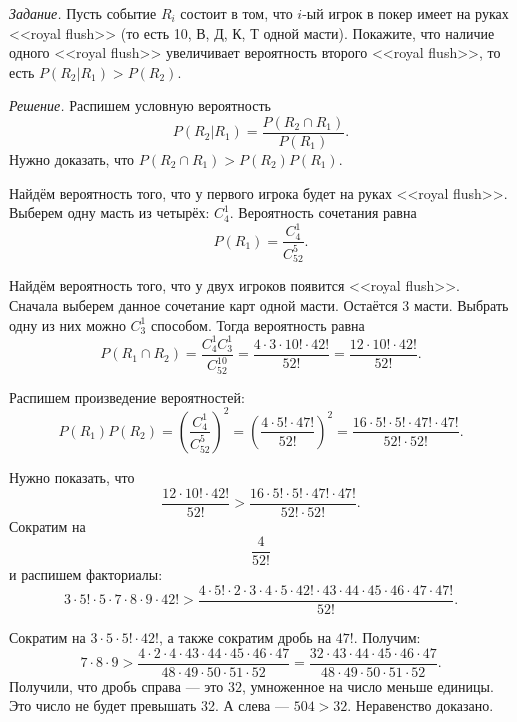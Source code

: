 \textit{Задание.} Пусть событие $R_i$ состоит в том, что $i$-ый игрок в покер имеет на руках <<royal flush>> (то есть 10, В, Д, К, Т одной масти).
Покажите, что наличие одного <<royal flush>> увеличивает вероятность второго <<royal flush>>, то есть
$P \left( \left. R_2 \right| R_1 \right) >
P \left( R_2 \right) $.

\textit{Решение.} Распишем условную вероятность
$$P \left( \left. R_2 \right| R_1 \right) =
\frac{P \left( R_2 \cap R_1 \right) }{P \left( R_1 \right) }.$$
Нужно доказать, что $P \left( R_2 \cap R_1 \right) > P \left( R_2 \right) P \left( R_1 \right) $.

Найдём вероятность того, что у первого игрока будет на руках <<royal flush>>.
Выберем одну масть из четырёх: $C_4^1$.
Вероятность сочетания равна
$$P \left( R_1 \right) =
\frac{C_4^1}{C_{52}^5}.$$

Найдём вероятность того, что у двух игроков появится <<royal flush>>.
Сначала выберем данное сочетание карт одной масти.
Остаётся 3 масти.
Выбрать одну из них можно $C_3^1$ способом.
Тогда вероятность равна
$$P \left( R_1 \cap R_2 \right) =
\frac{C_4^1C_3^1}{C_{52}^{10}} =
\frac{4 \cdot 3 \cdot 10! \cdot 42!}{52!} =
\frac{12 \cdot 10! \cdot 42!}{52!}.$$

Распишем произведение вероятностей:
$$P \left(R_1 \right) P \left( R_2 \right) =
\left( \frac{C_4^1}{C_{52}^{5}} \right)^2 =
\left( \frac{4 \cdot 5! \cdot 47!}{52!}\right)^2 =
\frac{16 \cdot 5! \cdot 5! \cdot 47! \cdot 47!}{52! \cdot 52!}.$$

Нужно показать, что
$$\frac{12 \cdot 10! \cdot 42!}{52!} >
\frac{16 \cdot 5! \cdot 5! \cdot 47! \cdot 47!}{52! \cdot 52!}.$$
Сократим на
$$ \frac{4}{52!}$$
и распишем факториалы:
$$3 \cdot 5! \cdot 5 \cdot 7 \cdot 8 \cdot 9 \cdot 42! >
\frac{4 \cdot 5! \cdot 2 \cdot 3 \cdot 4 \cdot 5 \cdot 42! \cdot 43 \cdot 44 \cdot 45 \cdot 46 \cdot 47 \cdot 47!}{52!}.$$

Сократим на $3 \cdot 5 \cdot 5! \cdot 42!$, а также сократим дробь на $47!$.
Получим:
$$7 \cdot 8 \cdot 9 >
\frac{4 \cdot 2 \cdot 4 \cdot 43 \cdot 44 \cdot 45 \cdot 46 \cdot 47}{48 \cdot 49 \cdot 50 \cdot 51 \cdot 52} =
\frac{32 \cdot 43 \cdot 44 \cdot 45 \cdot 46 \cdot 47}{48 \cdot 49 \cdot 50 \cdot 51 \cdot 52}.$$
Получили, что дробь справа --- это $32$, умноженное на число меньше единицы.
Это число не будет превышать 32.
А слева --- $504 > 32$.
Неравенство доказано.
